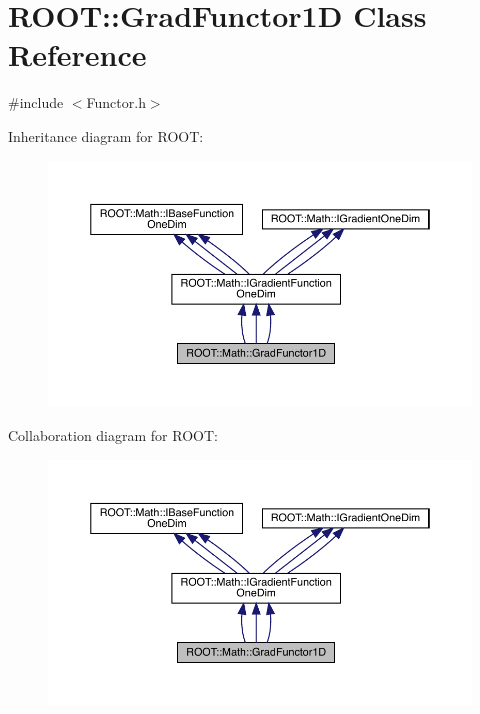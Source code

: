 \hypertarget{classROOT_1_1Math_1_1GradFunctor1D}{}\section{R\+O\+OT\+:\+:Grad\+Functor1D Class Reference}
\label{classROOT_1_1Math_1_1GradFunctor1D}


{\ttfamily \#include $<$Functor.\+h$>$}



Inheritance diagram for R\+O\+OT\+:
\nopagebreak
\begin{figure}[H]
\begin{center}
\leavevmode
\includegraphics[width=350pt]{de/d0b/classROOT_1_1Math_1_1GradFunctor1D__inherit__graph}
\end{center}
\end{figure}


Collaboration diagram for R\+O\+OT\+:
\nopagebreak
\begin{figure}[H]
\begin{center}
\leavevmode
\includegraphics[width=350pt]{d7/dad/classROOT_1_1Math_1_1GradFunctor1D__coll__graph}
\end{center}
\end{figure}
